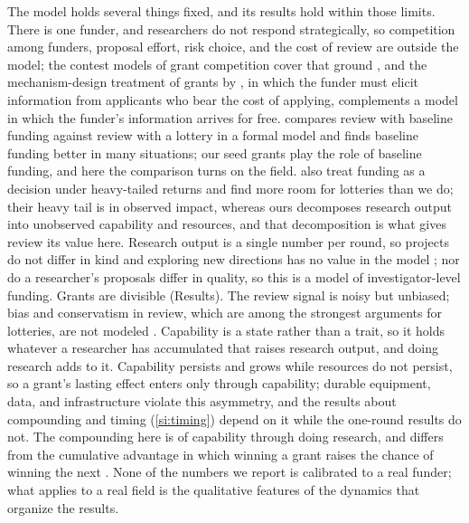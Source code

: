 \documentclass[article, 11pt, reqno]{amsart}
\theoremstyle{named}
\begin{document}
The model holds several things fixed, and its results hold within those limits. There is one funder, and researchers do not respond strategically, so competition among funders, proposal effort, risk choice, and the cost of review are outside the model; the contest models of grant competition cover that ground \citep{GrossBergstrom2019, GrossBergstrom2025}, and the mechanism-design treatment of grants by \citet{Carnehl2024}, in which the funder must elicit information from applicants who bear the cost of applying, complements a model in which the funder's information arrives for free. \citet{Sakamoto2023} compares review with baseline funding against review with a lottery in a formal model and finds baseline funding better in many situations; our seed grants play the role of baseline funding, and here the comparison turns on the field. \citet{Sorzano2026} also treat funding as a decision under heavy-tailed returns and find more room for lotteries than we do; their heavy tail is in observed impact, whereas ours decomposes research output into unobserved capability and resources, and that decomposition is what gives review its value here. Research output is a single number per round, so projects do not differ in kind and exploring new directions has no value in the model \citep{WeisbergMuldoon2009, AvinBJPS2019}; nor do a researcher's proposals differ in quality, so this is a model of investigator-level funding. Grants are divisible (Results). The review signal is noisy but unbiased; bias and conservatism in review, which are among the strongest arguments for lotteries, are not modeled \citep{Ginther2011, Witteman2019, Boudreau2016}. Capability is a state rather than a trait, so it holds whatever a researcher has accumulated that raises research output, and doing research adds to it. Capability persists and grows while resources do not persist, so a grant's lasting effect enters only through capability; durable equipment, data, and infrastructure violate this asymmetry, and the results about compounding and timing (\ref{si:timing}) depend on it while the one-round results do not. The compounding here is of capability through doing research, and differs from the cumulative advantage in which winning a grant raises the chance of winning the next \citep{Merton1968, BolVaanRijt2018}. None of the numbers we report is calibrated to a real funder; what applies to a real field is the qualitative features of the dynamics that organize the results.
\end{document}
